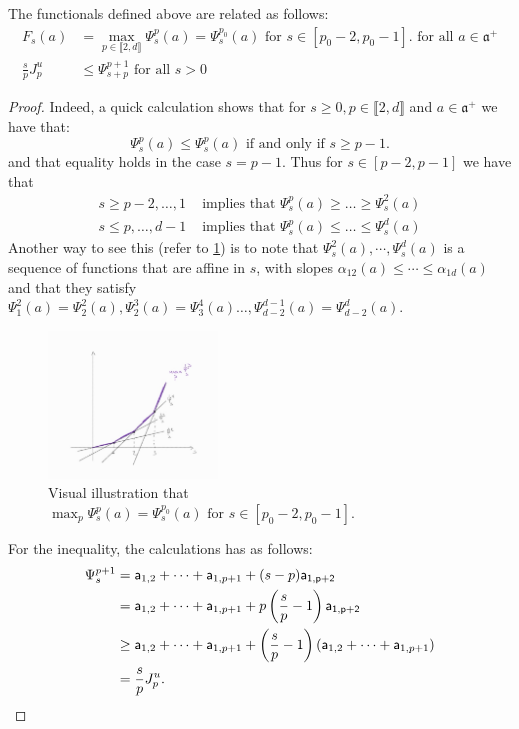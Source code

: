 \documentclass{report}
\begin{document}
\begin{lemma}\label{lem:functional_relations}
The functionals defined above are related as follows:
\begin{align*}
    F_s(a) &= \max_{p \in \llbracket 2, d \rrbracket} \Psi_s^p(a) = \Psi_s^{p_0}(a) \text{ for } s \in [p_0 - 2, p_0 -1]. \text{ for all } a \in \mathfrak a^+\\
    \frac{s}{p} J_{p}^u &\leq \Psi_{s+p}^{p + 1} \text{ for all } s > 0
\end{align*}
\end{lemma}
\begin{proof}
Indeed, a quick calculation shows that for $s \geq 0, p \in \llbracket 2, d \rrbracket$ and $a \in \mathfrak a^+$ we have that:
\[
    \Psi_s^p(a) \leq \Psi_s^p(a) \text{ if and only if } s \geq p-1.
\]
and that equality holds in the case $s = p - 1$.
Thus for $s \in [p - 2, p-1]$ we have that
\begin{align*}
    s \geq p-2, \ldots, 1 &\text{ implies that } \Psi_s^p(a) \geq \ldots \geq \Psi_s^{2}(a)\\
    s \leq p, \ldots, d-1 &\text{ implies that } \Psi_s^p(a) \leq \ldots \leq \Psi_s^d(a)
\end{align*}
Another way to see this (refer to \cref{fig:max}) is to note that $\Psi_s^2(a), \cdots, \Psi_s^d(a)$ is a sequence of functions that are affine in $s$, with slopes $\alpha_{12}(a) \leq \cdots \leq \alpha_{1d}(a)$ and that they satisfy $\Psi_1^2(a) = \Psi_2^2(a), \Psi_2^3(a) = \Psi_3^4(a) \ldots, \Psi_{d-2}^{d-1}(a) = \Psi_{d-2}^d(a)$.
\begin{figure}[h]
    \centering
    \includegraphics[width=0.4\textwidth]{max.jpg}
    \caption{Visual illustration that $\max_p\Psi_s^p(a) = \Psi_s^{p_0}(a) \text{ for } s \in [p_0 - 2, p_0 -1]$.}
    \label{fig:max}
\end{figure}

For the inequality, the calculations has as follows:
\begin{align*}
    \Psi_s^{p + 1} &=
    {\sf a}_{1,2} + \cdots + {\sf a}_{1,p + 1} + (s-p) {\sf a_{1,p+2}}\\
    &= 
    {\sf a}_{1,2} + \cdots + {\sf a}_{1,p + 1} + p\left(\frac{s}{p}-1\right) {\sf a_{1,p+2}}\\
    &\geq
    {\sf a}_{1,2} + \cdots + {\sf a}_{1,p + 1} + \left(\frac{s}{p}-1\right) ({\sf a}_{1,2} + \cdots + {\sf a}_{1,p + 1})\\
    &=
    \frac{s}{p} J_{p}^u.
\end{align*}

\end{proof}
\end{document}
